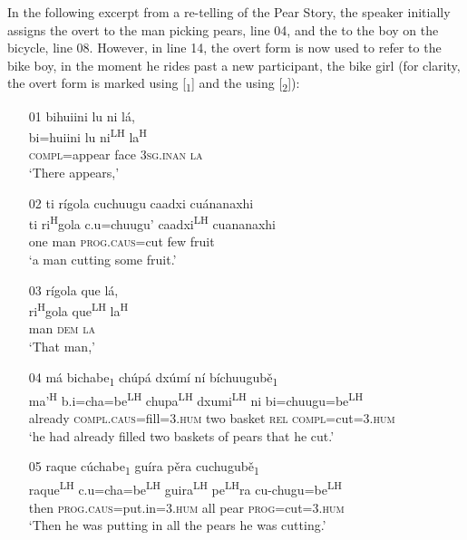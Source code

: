 In the following excerpt from a re-telling of the Pear Story, the speaker initially assigns the overt  to the man picking pears, line 04, and the  to the boy on the bicycle, line 08. However, in line 14, the overt form is now used to refer to the bike boy, in the moment he rides past a new participant, the bike girl (for clarity, the overt form is marked using [\textsubscript{1}] and the  using [\textsubscript{2}]):

\ea 
\begin{itemize}
\item[01]
\glll bihuiini lu ni l\'{a}, \\
bi=huiini lu ni\textsuperscript{LH} la\textsuperscript{H} \\
\textsc{compl}=appear face \textsc{3sg.inan} \textsc{la} \\
\glt `There appears,'


\item[02]
\glll ti r\'{i}gola cuchuugu caadxi cu\'{a}nanaxhi \\
ti ri\textsuperscript{H}gola c.u=chuugu' caadxi\textsuperscript{LH} cuananaxhi \\
one man \textsc{prog}.\textsc{caus}=cut few fruit \\
\glt `a man cutting some fruit.'


\item[03]
\glll r\'{i}gola que l\'{a},  \\
ri\textsuperscript{H}gola que\textsuperscript{LH} la\textsuperscript{H} \\
man \textsc{dem} \textsc{la} \\
\glt `That man,'


\item[04]
\glll m\'{a} bichabe\textsubscript{1} ch\'{u}p\'{a} dx\'{u}m\'{i} n\'{i} b\'{i}chuugub\v{e}\textsubscript{1} \\
ma'\textsuperscript{H} b.i=cha=be\textsuperscript{LH}  chupa\textsuperscript{LH} dxumi\textsuperscript{LH} ni bi=chuugu=be\textsuperscript{LH}  \\
already \textsc{compl}.\textsc{caus}=fill=\textsc{3.hum} two basket \textsc{rel} \textsc{compl}=cut=\textsc{3.hum} \\
\glt `he had already filled two baskets of pears that he cut.'


\item[05]
\glll raque c\'{u}chabe\textsubscript{1} gu\'{i}ra p\v{e}ra cuchugub\v{e}\textsubscript{1} \\
raque\textsuperscript{LH} c.u=cha=be\textsuperscript{LH}  guira\textsuperscript{LH} pe\textsuperscript{LH}ra cu-chugu=be\textsuperscript{LH}  \\
then \textsc{prog}.\textsc{caus}=put.in=\textsc{3.hum} all pear \textsc{prog}=cut=\textsc{3.hum} \\
\glt `Then he was putting in all the pears he was cutting.'



\end{itemize}
